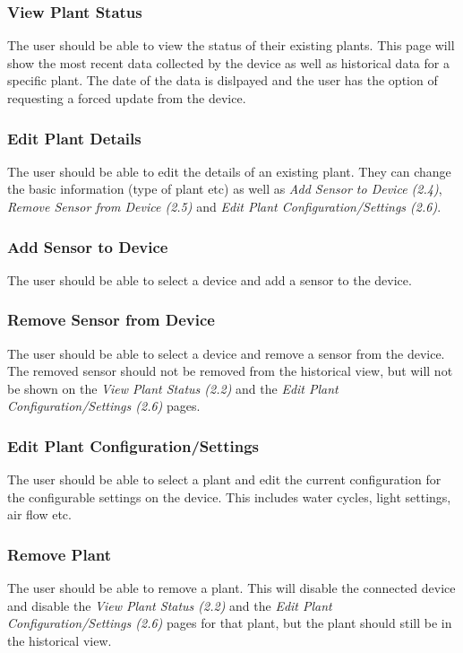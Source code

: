 \documentclass{article}
\begin{document}
		\subsubsection{View Plant Status}
			The user should be able to view the status of their existing plants. This page will show the most recent data collected by the device as well as historical data for a specific plant. The date of the data is dislpayed and the user has the option of requesting a forced update from the device.
		\subsubsection{Edit Plant Details}
			The user should be able to edit the details of an existing plant. They can change the basic information (type of plant etc) as well as \emph{Add Sensor to Device (2.4)}, \emph{Remove Sensor from Device (2.5)} and \emph{Edit Plant Configuration/Settings (2.6)}.
		\subsubsection{Add Sensor to Device}
			The user should be able to select a device and add a sensor to the device.
		\subsubsection{Remove Sensor from Device}
			The user should be able to select a device and remove a sensor from the device. The removed sensor should not be removed from the historical view, but will not be shown on the \emph{View Plant Status (2.2)} and the \emph{Edit Plant Configuration/Settings (2.6)} pages.
		\subsubsection{Edit Plant Configuration/Settings}
			The user should be able to select a plant and edit the current configuration for the configurable settings on the device. This includes water cycles, light settings, air flow etc.
		\subsubsection{Remove Plant}
			The user should be able to remove a plant. This will disable the connected device and disable the \emph{View Plant Status (2.2)} and the \emph{Edit Plant Configuration/Settings (2.6)} pages for that plant, but the plant should still be in the historical view.
	
	\newpage
\end{document}
